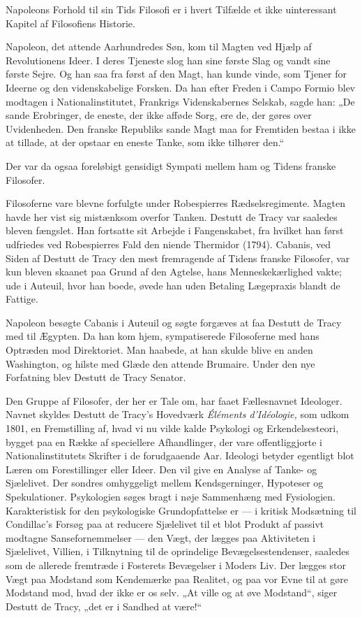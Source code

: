 \documentclass[12pt,a4paper,openany]{book}
\newcommand{\opage}[1]{\marginnote{\footnotesize\textit{[#1]}}}
\begin{document}
Napoleons Forhold til sin Tids Filosofi er i hvert Tilfælde
et ikke uinteressant Kapitel af Filosofiens Historie.

Napoleon, det attende Aarhundredes Søn, kom til Magten
ved Hjælp af Revolutionens Ideer. I deres Tjeneste slog han
sine første Slag og vandt sine første Sejre. Og han saa fra
først af den Magt, han kunde vinde, som Tjener for Ideerne
og den videnskabelige Forsken. Da han efter Freden i Campo
Formio blev modtagen i Nationalinstitutet, Frankrigs Videnskabernes
Selskab, sagde han: „De sande Erobringer, de eneste,
der ikke afføde Sorg, ere de, der gøres over Uvidenheden. Den
franske Republiks sande Magt maa for Fremtiden bestaa i ikke
at tillade, at der opstaar en eneste Tanke, som ikke tilhører
den.“

\setcounter{footnote}{0}%
\opage{185}Der var da ogsaa foreløbigt gensidigt Sympati mellem ham
og Tidens franske Filosofer.

Filosoferne vare blevne forfulgte under Robespierres Rædselsregimente.
Magten havde her vist sig mistænksom overfor
Tanken. Destutt de Tracy var saaledes bleven fængslet. Han
fortsatte sit Arbejde i Fangenskabet, fra hvilket han først udfriedes
ved Robespierres Fald den niende Thermidor (1794).
Cabanis, ved Siden af Destutt de Tracy den mest fremragende
af Tidens franske Filosofer, var kun bleven skaanet paa Grund
af den Agtelse, hans Menneskekærlighed vakte; ude i Auteuil,
hvor han boede, øvede han uden Betaling Lægepraxis blandt
de Fattige.

Napoleon besøgte Cabanis i Auteuil og søgte forgæves at
faa Destutt de Tracy med til Ægypten. Da han kom hjem,
sympatiserede Filosoferne med hans Optræden mod Direktoriet.
Man haabede, at han skulde blive en anden Washington, og
hilste med Glæde den attende Brumaire. Under den nye Forfatning
blev Destutt de Tracy Senator.

Den Gruppe af Filosofer, der her er Tale om, har faaet
Fællesnavnet Ideologer. Navnet skyldes Destutt de Tracy’s
Hovedværk \textit{Éléments d’Idéologie,} som udkom 1801, en Fremstilling
af, hvad vi nu vilde kalde Psykologi og Erkendelsesteori,
bygget paa en Række af speciellere Afhandlinger, der
vare offentliggjorte i Nationalinstitutets Skrifter i de forudgaaende
Aar. Ideologi betyder egentligt blot Læren om Forestillinger
eller Ideer. Den vil give en Analyse af Tanke- og Sjælelivet.
Der sondres omhyggeligt mellem Kendsgerninger, Hypoteser og
Spekulationer. Psykologien søges bragt i nøje Sammenhæng
med Fysiologien. Karakteristisk for den psykologiske Grundopfattelse
er --- i kritisk Modsætning til Condillac’s Forsøg paa
at reducere Sjælelivet til et blot Produkt af passivt modtagne
Sansefornemmelser --- den Vægt, der lægges paa Aktiviteten i
Sjælelivet, Villien, i Tilknytning til de oprindelige Bevægelsestendenser,
saaledes som de allerede fremtræde i Fosterets Bevægelser
i Moders Liv. Der lægges stor Vægt paa Modstand
som Kendemærke paa Realitet, og paa vor Evne til at gøre
Modstand mod, hvad der ikke er os selv. „At ville og at øve
\setcounter{footnote}{0}%
\opage{186}Modstand“, siger Destutt de Tracy, „det er i Sandhed at
være!“
\end{document}
